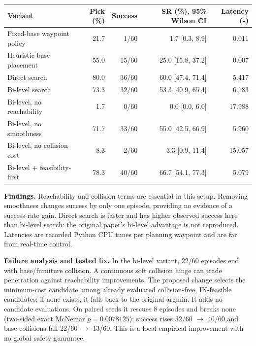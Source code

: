 \documentclass[10pt,a4paper]{article}
\begin{document}
\begin{center}\small
\begin{tabular}{lrrrr}\toprule
Variant & Pick (\%) & Success & SR (\%), 95\% Wilson CI & Latency (s)\\\midrule
Fixed-base waypoint policy & 21.7 & 1/60 & 1.7 [0.3, 8.9] & 0.011\\
Heuristic base placement & 55.0 & 15/60 & 25.0 [15.8, 37.2] & 0.007\\
Direct search & 80.0 & 36/60 & 60.0 [47.4, 71.4] & 5.417\\
Bi-level search & 73.3 & 32/60 & 53.3 [40.9, 65.4] & 6.183\\
Bi-level, no reachability & 1.7 & 0/60 & 0.0 [0.0, 6.0] & 17.988\\
Bi-level, no smoothness & 71.7 & 33/60 & 55.0 [42.5, 66.9] & 5.960\\
Bi-level, no collision cost & 8.3 & 2/60 & 3.3 [0.9, 11.4] & 15.057\\
Bi-level + feasibility-first & 78.3 & 40/60 & 66.7 [54.1, 77.3] & 5.079\\\bottomrule
\end{tabular}\end{center}
\textbf{Findings.} Reachability and collision terms are essential in this setup. Removing smoothness changes success by only one episode, providing no evidence of a success-rate gain. Direct search is faster and has higher observed success here than bi-level search: the original paper's bi-level advantage is not reproduced. Latencies are recorded Python CPU times per planning waypoint and are far from real-time control.

\textbf{Failure analysis and tested fix.} In the bi-level variant, 22/60 episodes end with base/furniture collision. A continuous soft collision hinge can trade penetration against reachability improvements. The proposed change selects the minimum-cost candidate among already evaluated collision-free, IK-feasible candidates; if none exists, it falls back to the original argmin. It adds no candidate evaluations. On paired seeds it rescues 8 episodes and breaks none (two-sided exact McNemar $p=0.0078125$); success rises 32/60 $\rightarrow$ 40/60 and base collisions fall 22/60 $\rightarrow$ 13/60. This is a local empirical improvement with no global safety guarantee.
\end{document}

